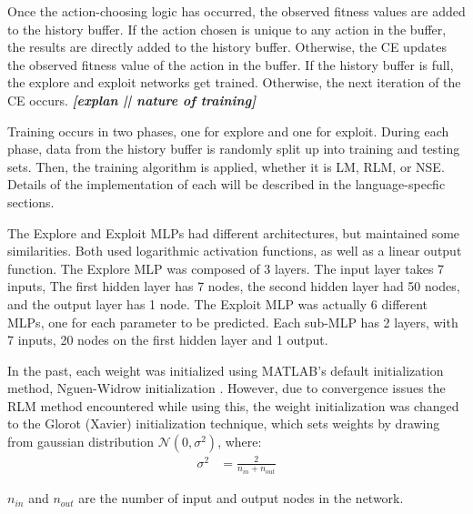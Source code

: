 \par Once the action-choosing logic has occurred, the observed fitness values are added to the history buffer. If the action chosen is unique to any action in the buffer, the results are directly added to the history buffer. Otherwise, the CE updates the observed fitness value of the action in the buffer. If the history buffer is full, the explore and exploit networks get trained. Otherwise, the next iteration of the CE occurs. \textit{\textbf{[explan || nature of training]}}
\par Training occurs in two phases, one for explore and one for exploit. During each phase, data from the history buffer is randomly split up into training and testing sets. Then, the training algorithm is applied, whether it is LM, RLM, or NSE. Details of the implementation of each will be described in the language-specfic sections. 
\par The Explore and Exploit MLPs had different architectures, but maintained some similarities. Both used logarithmic activation functions, as well as a linear output function. The Explore MLP was composed of 3 layers. The input layer takes 7 inputs, The first hidden layer has 7 nodes, the second hidden layer had 50 nodes, and the output layer has 1 node. The Exploit MLP was actually 6 different MLPs, one for each parameter to be predicted. Each sub-MLP has 2 layers, with 7  inputs, 20 nodes on the first hidden layer and 1 output. 
\par In the past, each weight was initialized using MATLAB's default initialization method, Nguen-Widrow initialization \cite{placeholderCitation}. However, due to convergence issues the RLM method encountered while using this, the weight initialization was changed to the Glorot (Xavier) initialization technique\cite{glorot_training}, which sets weights by drawing from gaussian distribution $\mathcal{N}(0,\sigma^2)$, where:
\begin{align*}
	\sigma^2 &= \frac{2}{n_{in}+n_{out}}
\end{align*} 
\par $n_{in}$ and $n_{out}$ are the number of input and output nodes in the network.
